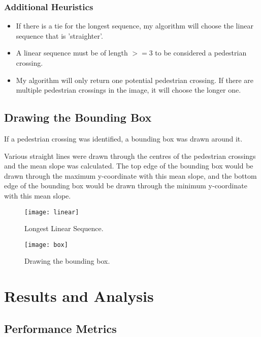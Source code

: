 \documentclass{article}  %
\begin{document}
	\subsubsection*{Additional Heuristics}
	
	\begin{itemize}
		\item If there is a tie for the longest sequence, my algorithm will choose the linear sequence that is 'straighter'.
		\item A linear sequence must be of length $>= 3$ to be considered a pedestrian crossing.
		\item My algorithm will only return one potential pedestrian crossing. If there are multiple pedestrian crossings in the image, it will choose the longer one.
	\end{itemize}
	
	\subsection{Drawing the Bounding Box}\label{bounding-box}
	
	If a pedestrian crossing was identified, a bounding box was drawn around it.
	
	Various straight lines were drawn through the centres of the pedestrian crossings and the mean slope was calculated. The top edge of the bounding box would be drawn through the maximum y-coordinate with this mean slope, and the bottom edge of the bounding box would be drawn through the minimum y-coordinate with this mean slope.
	
	\begin{figure}[H]
		\begin{minipage}[c]{0.45\linewidth}
			\centering
			\texttt{[image: linear]}
			\caption{Longest Linear Sequence.}
		\end{minipage}\hfill
		\begin{minipage}[c]{0.45\linewidth}
			\centering
			\texttt{[image: box]}
			\caption{Drawing the bounding box.}
		\end{minipage}
	\end{figure}
	
	\section{Results and Analysis}
	
	\subsection{Performance Metrics}
	
\end{document}
